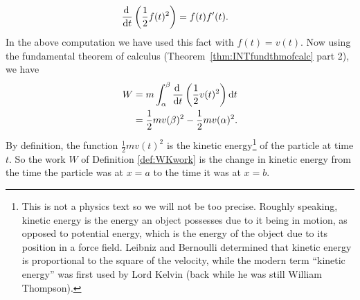 \begin{align*}
  \diff{}{t}\left( \frac{1}{2} f(t)^2 \right) &= f(t) f'(t).
\end{align*}
In the above computation we have used this fact with $f(t) = v(t)$. Now using the
fundamental theorem of calculus (Theorem~\ref{thm:INTfundthmofcalc} part 2), we have
\begin{align*}
W&= m \int_\alpha^\beta \diff{}{t} \left( \frac{1}{2} v(t)^2 \right) \dee{t}\\
&= \frac{1}{2} mv(\beta)^2 - \frac{1}{2}mv(\alpha)^2.
\end{align*}
By definition, the function $\frac{1}{2} mv(t)^2$ is the kinetic
energy\footnote{This is not a physics text so we will not be too precise. Roughly
speaking, kinetic energy is the energy an object possesses due to it being in motion, as
opposed to potential energy, which is the energy of the object due to its position in a
force field. Leibniz and Bernoulli determined that kinetic energy is proportional to the
square of the velocity, while the modern term ``kinetic energy'' was first used by Lord
Kelvin (back while he was still William Thompson).} of the particle at time $t$. So the
work $W$ of Definition \ref{def:WKwork} is the change in kinetic energy
from the time the particle was at $x=a$ to the time it was at $x=b$.


